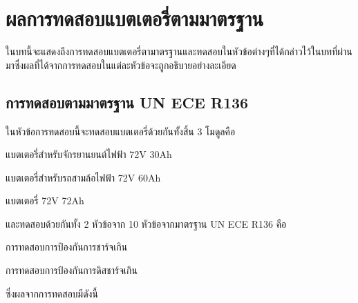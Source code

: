 \chapter{ผลการทดสอบแบตเตอรี่ตามมาตรฐาน}
ในบทนี้จะแสดงถึงการทดสอบแบตเตอรี่ตามาตรฐานและทดสอบในหัวข้อต่างๆที่ได้กล่าวไว้ในบทที่ผ่านมาซึ่งผลที่ได้จากการทดสอบในแต่ละหัวข้อจะถูกอธิบายอย่างละเอียด
\section{การทดสอบตามมาตรฐาน UN ECE R136}
ในหัวข้อการทดสอบนี้จะทดสอบแบตเตอรี่ด้วยกันทั้งสิ้น 3 โมดูลคือ
\begin{itemize}
 {\item แบตเตอรี่สำหรับจักรยานยนต์ไฟฟ้า 72V 30Ah}
 {\item แบตเตอรี่สำหรับรถสามล้อไฟฟ้า 72V 60Ah}
 {\item แบตเตอรี่ 72V 72Ah}
\end{itemize}
และทดสอบด้วยกันทั้ง 2 หัวข้อจาก 10 หัวข้อจากมาตรฐาน UN ECE R136 คือ
\begin{itemize}
 {\item การทดสอบการป้องกันการชาร์จเกิน}
 {\item การทดสอบการป้องกันการดิสชาร์จเกิน}
\end{itemize}
ซึ่งผลจากการทดสอบมีดังนี้
